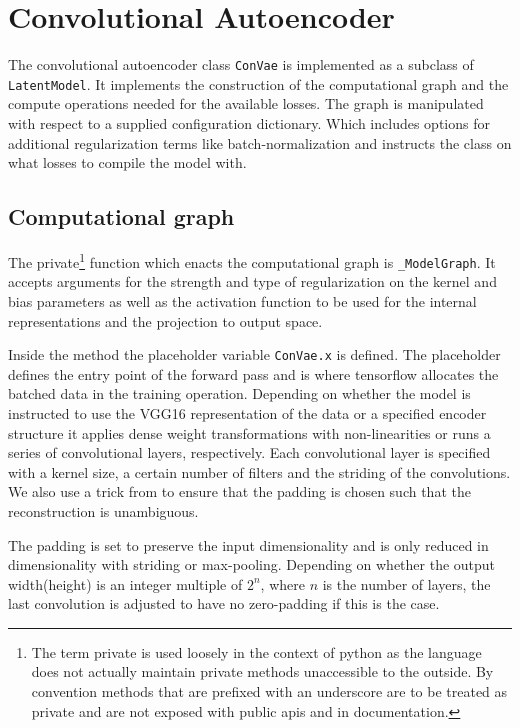 
\section{Convolutional Autoencoder}\label{sec:convae_implement}

The convolutional autoencoder class \lstinline{ConVae} is implemented as a subclass of \lstinline{LatentModel}. It implements the construction of the computational graph and the compute operations needed for the available losses. The graph is manipulated with respect to a supplied configuration dictionary. Which includes options for additional regularization terms like batch-normalization and instructs the class on what losses to compile the model with. 

\subsection{Computational graph}

The private\footnote{The term private is used loosely in the context of python as the language does not actually maintain private methods unaccessible to the outside. By convention methods that are prefixed with an underscore are to be treated as private and are not exposed with public apis and in documentation.} function which enacts the computational graph is \lstinline{_ModelGraph}. It accepts arguments for the strength and type of regularization on the kernel and bias parameters as well as the activation function to be used for the internal representations and the projection to output space. 

Inside the method the placeholder variable \lstinline{ConVae.x} is defined. The placeholder defines the entry point of the forward pass and is where tensorflow allocates the batched data in the training operation. Depending on whether the model is instructed to use the VGG16 representation of the data or a specified encoder structure it applies dense weight transformations with non-linearities or runs a series of convolutional layers, respectively. Each convolutional layer is specified with a kernel size, a certain number of filters and the striding of the convolutions. We also use a trick from \citet{Guo2017} to ensure that the padding is chosen such that the reconstruction is unambiguous. 

The padding is set to preserve the input dimensionality and is only reduced in dimensionality with striding or max-pooling. Depending on whether the output width(height) is an integer multiple of $2^n$, where $n$ is the number of layers, the last convolution is adjusted to have no zero-padding if this is the case. 


